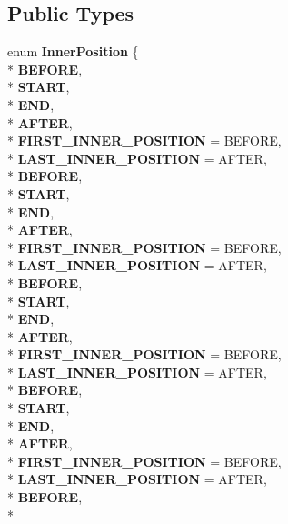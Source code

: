 \subsection*{Public Types}
\begin{DoxyCompactItemize}
\item 
enum {\bfseries Inner\+Position} \{ \\*
{\bfseries B\+E\+F\+O\+RE}, 
\\*
{\bfseries S\+T\+A\+RT}, 
\\*
{\bfseries E\+ND}, 
\\*
{\bfseries A\+F\+T\+ER}, 
\\*
{\bfseries F\+I\+R\+S\+T\+\_\+\+I\+N\+N\+E\+R\+\_\+\+P\+O\+S\+I\+T\+I\+ON} = B\+E\+F\+O\+RE, 
\\*
{\bfseries L\+A\+S\+T\+\_\+\+I\+N\+N\+E\+R\+\_\+\+P\+O\+S\+I\+T\+I\+ON} = A\+F\+T\+ER, 
\\*
{\bfseries B\+E\+F\+O\+RE}, 
\\*
{\bfseries S\+T\+A\+RT}, 
\\*
{\bfseries E\+ND}, 
\\*
{\bfseries A\+F\+T\+ER}, 
\\*
{\bfseries F\+I\+R\+S\+T\+\_\+\+I\+N\+N\+E\+R\+\_\+\+P\+O\+S\+I\+T\+I\+ON} = B\+E\+F\+O\+RE, 
\\*
{\bfseries L\+A\+S\+T\+\_\+\+I\+N\+N\+E\+R\+\_\+\+P\+O\+S\+I\+T\+I\+ON} = A\+F\+T\+ER, 
\\*
{\bfseries B\+E\+F\+O\+RE}, 
\\*
{\bfseries S\+T\+A\+RT}, 
\\*
{\bfseries E\+ND}, 
\\*
{\bfseries A\+F\+T\+ER}, 
\\*
{\bfseries F\+I\+R\+S\+T\+\_\+\+I\+N\+N\+E\+R\+\_\+\+P\+O\+S\+I\+T\+I\+ON} = B\+E\+F\+O\+RE, 
\\*
{\bfseries L\+A\+S\+T\+\_\+\+I\+N\+N\+E\+R\+\_\+\+P\+O\+S\+I\+T\+I\+ON} = A\+F\+T\+ER, 
\\*
{\bfseries B\+E\+F\+O\+RE}, 
\\*
{\bfseries S\+T\+A\+RT}, 
\\*
{\bfseries E\+ND}, 
\\*
{\bfseries A\+F\+T\+ER}, 
\\*
{\bfseries F\+I\+R\+S\+T\+\_\+\+I\+N\+N\+E\+R\+\_\+\+P\+O\+S\+I\+T\+I\+ON} = B\+E\+F\+O\+RE, 
\\*
{\bfseries L\+A\+S\+T\+\_\+\+I\+N\+N\+E\+R\+\_\+\+P\+O\+S\+I\+T\+I\+ON} = A\+F\+T\+ER, 
\\*
{\bfseries B\+E\+F\+O\+RE}, 
\\*

\end{DoxyCompactItemize}
